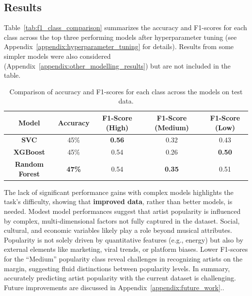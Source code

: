 \documentclass{article}
\begin{document}
\subsection{Results}

Table~\ref{tab:f1_class_comparison} summarizes the accuracy and F1-scores for each class across the top three performing models after hyperparameter tuning (see Appendix~\ref{appendix:hyperparameter_tuning} for details). Results from some simpler models were also considered (Appendix~\ref{appendix:other_modelling_results}) but are not included in the table.



\begin{table}[h]
\centering
\begin{tabular}{|c|c|c|c|c|}
\hline
\textbf{Model}      & \textbf{Accuracy} & \textbf{F1-Score (High)} & \textbf{F1-Score (Medium)} & \textbf{F1-Score (Low)} \\ \hline
\textbf{SVC}        & 45\%              & \textbf{0.56}            & 0.32                       & 0.43                   \\ \hline
\textbf{XGBoost}    & 45\%     & 0.54                     & 0.26                       & \textbf{0.50}          \\ \hline
\textbf{Random Forest} & \textbf{47\%}           & 0.54                     & \textbf{0.35}              & 0.51                   \\ \hline
\end{tabular}
\captionsetup{belowskip=12pt,aboveskip=8pt}
\caption{Comparison of accuracy and F1-scores for each class across the models on test data.}
\label{tab:f1_class_comparison_tuned}
\end{table}

The lack of significant performance gains with complex models highlights the task's difficulty, showing that \textbf{improved data}, rather than better models, is needed. Modest model performances suggest that artist popularity is influenced by complex, multi-dimensional factors not fully captured in the dataset. Social, cultural, and economic variables likely play a role beyond musical attributes. Popularity is not solely driven by quantitative features (e.g., energy) but also by external elements like marketing, viral trends, or platform biases. Lower F1-scores for the ``Medium'' popularity class reveal challenges in recognizing artists on the margin, suggesting fluid distinctions between popularity levels. In summary, accurately predicting artist popularity with the current dataset is challenging. Future improvements are discussed in Appendix~\ref{appendix:future_work}..
\end{document}
